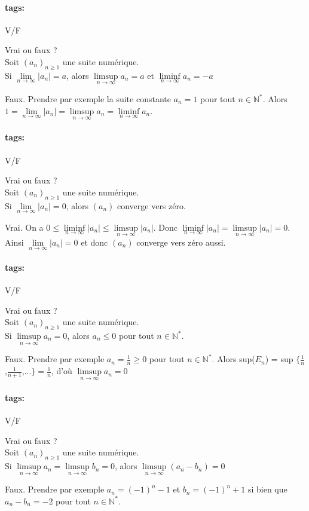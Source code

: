 \documentclass[12pt]{article}
\newcommand*{\xfield}[1]{\begin{mdframed}\centering #1\end{mdframed}\bigskip}
\newenvironment{note}{}{}
\newcommand*{\tags}[1]{\paragraph{tags: }#1}
\begin{document}
\begin{note}
\tags{V/F}
	\xfield{Vrai ou faux ?\\
	Soit $(a_n)_{n\ge 1}$ une suite numérique.\\
	Si $\lim\limits_{n \to \infty} \vert a_n \vert = a$, alors $\limsup\limits_{n \to \infty}a_n = a$ et $\liminf\limits_{n \to \infty}a_n = -a$}
	\xfield{Faux. Prendre par exemple la suite constante $a_n = 1$ pour tout $n \in \mathbb{N}^*$. Alors $1= \lim\limits_{n \to \infty} \vert a_n \vert = \limsup\limits_{n \to \infty} a_n = \liminf\limits_{n \to \infty} a_n$.}
\end{note}

\begin{note}
\tags{V/F}
	\xfield{Vrai ou faux ?\\
	Soit $(a_n)_{n\ge 1}$ une suite numérique.\\
	Si $\lim\limits_{n \to \infty} \vert a_n \vert = 0$, alors $(a_n)$ converge vers zéro.}
	\xfield{Vrai. On a $0 \le \liminf\limits_{n \to \infty} \vert a_n \vert \le \limsup\limits_{n \to \infty} \vert a_n \vert$. Donc $\liminf\limits_{n \to \infty} \vert a_n \vert = \limsup\limits_{n \to \infty} \vert a_n \vert = 0$. Ainsi $\lim\limits_{n \to \infty} \vert a_n \vert =0$ et donc $(a_n)$ converge vers zéro aussi.}
\end{note}

\begin{note}
\tags{V/F}
	\xfield{Vrai ou faux ?\\
	Soit $(a_n)_{n\ge 1}$ une suite numérique.\\
	Si $\limsup\limits_{n \to \infty}a_n = 0$, alors $a_n \le 0$ pour tout $n \in \mathbb{N}^*$.}
	\xfield{Faux. Prendre par exemple $a_n = \frac{1}{n} \ge 0$ pour tout $n \in \mathbb{N}^*$. Alors sup($E_n$) = sup $\{\frac{1}{n}$,$\frac{1}{n+1}$,...$\} = \frac{1}{n}$, d'où $\limsup\limits_{n \to \infty} a_n = 0$}
\end{note}

\begin{note}
\tags{V/F}
	\xfield{Vrai ou faux ?\\
	Soit $(a_n)_{n\ge 1}$ une suite numérique.\\
	Si $\limsup\limits_{n \to \infty}a_n = \limsup\limits_{n \to \infty}b_n =0$, alors $\limsup\limits_{n \to \infty}(a_n-b_n) = 0$}
	\xfield{Faux. Prendre par exemple $a_n = (-1)^n -1$ et $b_n = (-1)^n + 1$ si bien que $a_n - b_n = -2$ pour tout $n \in \mathbb{N}^*$.}
\end{note}
\end{document}
